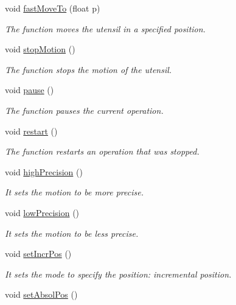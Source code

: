 \begin{DoxyCompactItemize}
void \hyperlink{class_milling_machine_a9b2022ac64164727f57ff0cbf50e60ed}{fast\+Move\+To} (float p)
\begin{DoxyCompactList}\small\item\em The function moves the utensil in a specified position. \end{DoxyCompactList}\item 
void \hyperlink{class_milling_machine_a3b530b356897ef7b7d25f55ce8965775}{stop\+Motion} ()
\begin{DoxyCompactList}\small\item\em The function stops the motion of the utensil. \end{DoxyCompactList}\item 
void \hyperlink{class_milling_machine_a8600c252d19b2b1318400c3e8567591b}{pause} ()
\begin{DoxyCompactList}\small\item\em The function pauses the current operation. \end{DoxyCompactList}\item 
void \hyperlink{class_milling_machine_a9bd0cff7083490bf93c1c04d728e7050}{restart} ()
\begin{DoxyCompactList}\small\item\em The function restarts an operation that was stopped. \end{DoxyCompactList}\item 
void \hyperlink{class_milling_machine_a3236520b26c7ab2ebad6a89edfc67d8c}{high\+Precision} ()
\begin{DoxyCompactList}\small\item\em It sets the motion to be more precise. \end{DoxyCompactList}\item 
void \hyperlink{class_milling_machine_a1596fbec50d30b119393c9dec4afb164}{low\+Precision} ()
\begin{DoxyCompactList}\small\item\em It sets the motion to be less precise. \end{DoxyCompactList}\item 
void \hyperlink{class_milling_machine_a07f35ca38be74aa50663a22caeb6cd3e}{set\+Incr\+Pos} ()
\begin{DoxyCompactList}\small\item\em It sets the mode to specify the position\+: incremental position. \end{DoxyCompactList}\item 
void \hyperlink{class_milling_machine_a0e370f1cd0f4a3fba8dce457d8c539f0}{set\+Absol\+Pos} ()

\end{DoxyCompactItemize}
